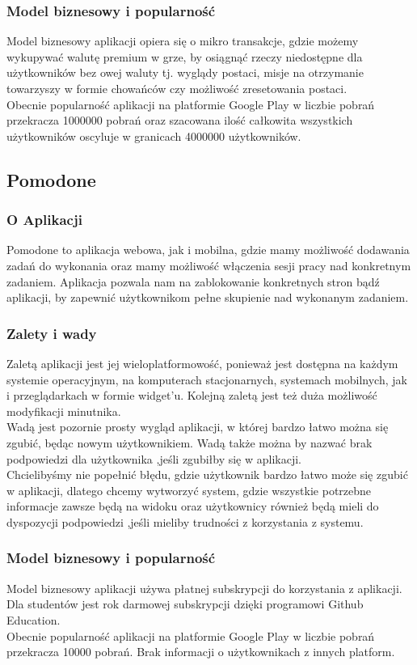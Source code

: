 \documentclass[a4paper,11pt]{report}
\begin{document}
\subsubsection{Model biznesowy i popularność}
Model biznesowy aplikacji opiera się o mikro transakcje, gdzie możemy wykupywać walutę premium w grze,
 by osiągnąć rzeczy niedostępne dla użytkowników bez owej waluty tj. wyglądy postaci,
 misje na otrzymanie towarzyszy w formie chowańców czy możliwość zresetowania postaci.
\vspace{0,5cm}\\
Obecnie popularność aplikacji na platformie Google Play w liczbie pobrań przekracza 1000000 pobrań
 oraz szacowana ilość całkowita wszystkich użytkowników oscyluje w granicach 4000000 użytkowników.
\subsection{Pomodone}
\subsubsection{O Aplikacji}
Pomodone to aplikacja webowa, jak i mobilna, gdzie mamy możliwość dodawania zadań do wykonania
 oraz mamy możliwość włączenia sesji pracy nad konkretnym zadaniem.
 Aplikacja pozwala nam na zablokowanie konkretnych stron bądź aplikacji,
 by zapewnić użytkownikom pełne skupienie nad wykonanym zadaniem.
\subsubsection{Zalety i wady}
Zaletą aplikacji jest jej wieloplatformowość,
 ponieważ jest dostępna na każdym systemie operacyjnym, na komputerach stacjonarnych, systemach mobilnych,
 jak i przeglądarkach w formie widget'u.
 Kolejną zaletą jest też duża możliwość modyfikacji minutnika.
\vspace{0,5cm}
\\ Wadą jest pozornie prosty wygląd aplikacji, w której bardzo łatwo można się zgubić, będąc nowym użytkownikiem.
Wadą także można by nazwać brak podpowiedzi dla użytkownika ,jeśli zgubiłby się w aplikacji.
\vspace{0,5cm}
\\Chcielibyśmy nie popełnić błędu, gdzie użytkownik bardzo łatwo może się zgubić w aplikacji,
 dlatego chcemy wytworzyć system, gdzie wszystkie potrzebne informacje zawsze będą na widoku
 oraz użytkownicy również będą mieli do dyspozycji podpowiedzi ,jeśli mieliby trudności z korzystania z systemu.
\subsubsection{Model biznesowy i popularność}
Model biznesowy aplikacji używa płatnej subskrypcji do korzystania z aplikacji.
 Dla studentów jest rok darmowej subskrypcji dzięki programowi Github Education.
\vspace{0,5cm}\\
Obecnie popularność aplikacji na platformie Google Play w liczbie pobrań przekracza 10000 pobrań.
 Brak informacji o użytkownikach z innych platform.
\end{document}
